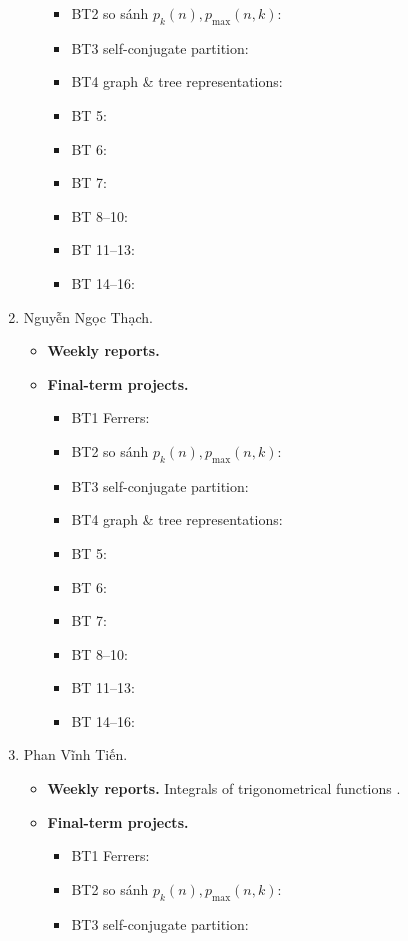\documentclass{article}
\begin{document}
\begin{enumerate}
\begin{itemize}
\begin{itemize}
            \item BT2 so sánh $p_k(n),p_{\max}(n,k)$:
            \item BT3 self-conjugate partition:
            \item BT4 graph \& tree representations:
            \item BT 5:
            \item BT 6:
            \item BT 7:
            \item BT 8--10:
            \item BT 11--13:
            \item BT 14--16:
        \end{itemize}
    \end{itemize}
    \item {\sc Nguyễn Ngọc Thạch.}
    \begin{itemize}
        \item {\bf Weekly reports.}
        \item {\bf Final-term projects.}
        \begin{itemize}
            \item BT1 Ferrers:
            \item BT2 so sánh $p_k(n),p_{\max}(n,k)$:
            \item BT3 self-conjugate partition:
            \item BT4 graph \& tree representations:
            \item BT 5:
            \item BT 6:
            \item BT 7:
            \item BT 8--10:
            \item BT 11--13:
            \item BT 14--16:
        \end{itemize}
    \end{itemize}
    \item {\sc Phan Vĩnh Tiến.}
    \begin{itemize}
        \item {\bf Weekly reports.} Integrals of trigonometrical functions .
        \item {\bf Final-term projects.}
        \begin{itemize}
            \item BT1 Ferrers:
            \item BT2 so sánh $p_k(n),p_{\max}(n,k)$:
            \item BT3 self-conjugate partition:

\end{itemize}
\end{itemize}
\end{enumerate}
\end{document}
